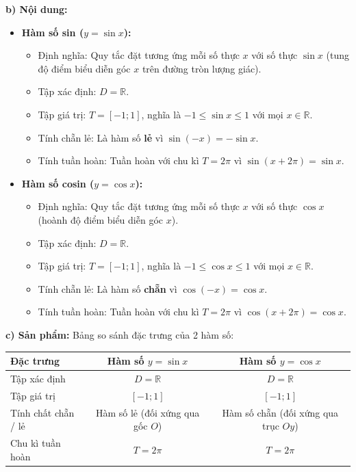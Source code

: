 \documentclass[12pt, a4paper]{article}
\begin{document}
\textbf{b) Nội dung:}
\begin{itemize}[leftmargin=0.6cm]
    \item \textbf{Hàm số sin ($y = \sin x$):}
    \begin{itemize}[leftmargin=0.5cm]
        \item Định nghĩa: Quy tắc đặt tương ứng mỗi số thực $x$ với số thực $\sin x$ (tung độ điểm biểu diễn góc $x$ trên đường tròn lượng giác).
        \item Tập xác định: $D = \mathbb{R}$.
        \item Tập giá trị: $T = [-1; 1]$, nghĩa là $-1 \le \sin x \le 1$ với mọi $x \in \mathbb{R}$.
        \item Tính chẵn lẻ: Là hàm số \textbf{lẻ} vì $\sin(-x) = -\sin x$.
        \item Tính tuần hoàn: Tuần hoàn với chu kì \textbf{$T = 2\pi$} vì $\sin(x + 2\pi) = \sin x$.
    \end{itemize}
    \item \textbf{Hàm số cosin ($y = \cos x$):}
    \begin{itemize}[leftmargin=0.5cm]
        \item Định nghĩa: Quy tắc đặt tương ứng mỗi số thực $x$ với số thực $\cos x$ (hoành độ điểm biểu diễn góc $x$).
        \item Tập xác định: $D = \mathbb{R}$.
        \item Tập giá trị: $T = [-1; 1]$, nghĩa là $-1 \le \cos x \le 1$ với mọi $x \in \mathbb{R}$.
        \item Tính chẵn lẻ: Là hàm số \textbf{chẵn} vì $\cos(-x) = \cos x$.
        \item Tính tuần hoàn: Tuần hoàn với chu kì \textbf{$T = 2\pi$} vì $\cos(x + 2\pi) = \cos x$.
    \end{itemize}
\end{itemize}

\textbf{c) Sản phẩm:} Bảng so sánh đặc trưng của 2 hàm số:
\begin{center}
\begin{tabular}{lcc}
\toprule
\textbf{Đặc trưng} & \textbf{Hàm số $y = \sin x$} & \textbf{Hàm số $y = \cos x$} \\
\midrule
Tập xác định & $D = \mathbb{R}$ & $D = \mathbb{R}$ \\
Tập giá trị & $[-1; 1]$ & $[-1; 1]$ \\
Tính chất chẵn / lẻ & Hàm số lẻ (đối xứng qua gốc $O$) & Hàm số chẵn (đối xứng qua trục $Oy$) \\
Chu kì tuần hoàn & $T = 2\pi$ & $T = 2\pi$ \\
\bottomrule
\end{tabular}
\end{center}
\end{document}
